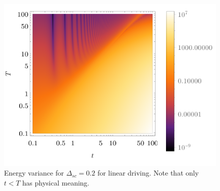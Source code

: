 \begin{figure}[h]
    \centering
    \vspace{-20pt}\includegraphics[scale=1.2]{../img/densVariance.pdf}
    \vspace{-8pt}\caption{Energy variance for $\Delta_{sc}=0.2$ for linear driving. Note that only $t<T$ has physical meaning.}
    \label{fig:densVariance}
\end{figure}

